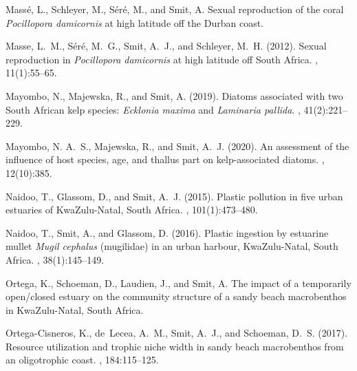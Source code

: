 \begin{thebibliography}{}
  Mass{\'e}, L., Schleyer, M., S{\'e}r{\'e}, M., and Smit, A.
  \newblock Sexual reproduction of the coral \emph{Pocillopora damicornis} at
    high latitude off the {D}urban coast.
  
  Masse, L.~M., S{\'e}r{\'e}, M.~G., Smit, A.~J., and Schleyer, M.~H. (2012).
  \newblock Sexual reproduction in \emph{Pocillopora damicornis} at high latitude
    off {S}outh {A}frica.
  , 11(1):55--65.
  
  Mayombo, N., Majewska, R., and Smit, A. (2019).
  \newblock Diatoms associated with two {S}outh {A}frican kelp species:
    \emph{Ecklonia maxima} and \emph{Laminaria pallida}.
  , 41(2):221--229.
  
  Mayombo, N. A.~S., Majewska, R., and Smit, A.~J. (2020).
  \newblock An assessment of the influence of host species, age, and thallus part
    on kelp-associated diatoms.
  , 12(10):385.
  
  Naidoo, T., Glassom, D., and Smit, A.~J. (2015).
  \newblock Plastic pollution in five urban estuaries of {K}wa{Z}ulu-{N}atal,
    {S}outh {A}frica.
  , 101(1):473--480.
  
  Naidoo, T., Smit, A., and Glassom, D. (2016).
  \newblock Plastic ingestion by estuarine mullet \emph{Mugil cephalus}
    (mugilidae) in an urban harbour, {K}wa{Z}ulu-{N}atal, {S}outh {A}frica.
  , 38(1):145--149.
  
  Ortega, K., Schoeman, D., Laudien, J., and Smit, A.
  \newblock The impact of a temporarily open/closed estuary on the community
    structure of a sandy beach macrobenthos in {K}wa{Z}ulu-{N}atal, {S}outh
    {A}frica.
  
  Ortega-Cisneros, K., de~Lecea, A.~M., Smit, A.~J., and Schoeman, D.~S. (2017).
  \newblock Resource utilization and trophic niche width in sandy beach
    macrobenthos from an oligotrophic coast.
  , 184:115--125.
  

\end{thebibliography}
